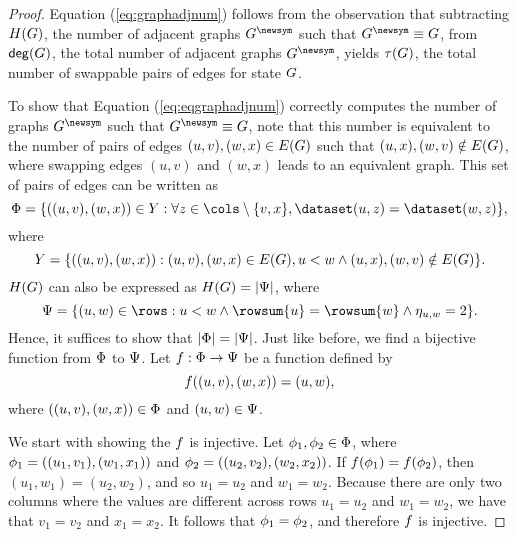 \begin{proof}
  Equation (\ref{eq:graphadjnum}) follows from the observation that subtracting
  $H(G)$, the number of adjacent graphs $\graphadj$ such that
  $\graphadj \equiv \graph$, from $\mathsf{deg}(G)$, the total number of
  adjacent graphs $\graphadj$, yields $\tau(G)$, the total number
  of swappable pairs of edges for state $G$.

  To show that Equation (\ref{eq:eqgraphadjnum}) correctly computes the
  number of graphs $\graphadj$ such that $\graphadj \equiv \graph$, note
  that this number is equivalent to the number of pairs of edges $(u, v), (w,
  x) \in E(G)$ such that $(u, x), (w, v) \notin E(G)$,
  where swapping edges $(u, v)$ and $(w, x)$ leads to an equivalent graph.
  This set of pairs of edges can be written as
  \[
    \spairsgieq = \{((u, v), (w, x)) \in \spairsgi : \forall z \in \cols
    \setminus \{v, x\}, \dataset(u, z) = \dataset(w, z)\},
  \]
  where
  \[
    Y = \{((u, v), (w, x)) : (u, v), (w, x) \in E(G), u < w
    \wedge (u, x), (w, v) \notin E(G)\}.
  \]
  $H(G)$ can also be expressed as $H(G) =
  |\Psi|$, where
  \[
    \eqgraphs = \{(u, w) \in \rows : u < w \wedge \rowsum{u} = \rowsum{w}
    \wedge \colsneqnum{u}{w} = 2\}.
  \]
  Hence, it suffices to show that $|\Phi| = |\Psi|$. Just like
  before, we find a bijective function from $\Phi$ to $\Psi$.
  Let $f : \Phi \rightarrow \Psi$ be a function defined by
  \[
    f((u, v), (w, x)) = (u, w),
  \]
  where $((u, v), (w, x)) \in \Phi$ and $(u, w) \in \Psi$.

  We start with showing the $f$ is injective. Let $\phi_{1},
  \phi_{2} \in \Phi$, where $\phi_{1} = ((u_1, v_1),
  (w_1, x_1))$ and $\phi_{2} = ((u_2, v_2), (w_2, x_2))$. If
  $f(\phi_{1}) = f(\phi_{2})$, then $(u_1,
  w_1) = (u_2, w_2)$, and so $u_1 = u_2$ and $w_1 = w_2$. Because there are
  only two columns where the values are different across rows $u_1 = u_2$ and
  $w_1 = w_2$, we have that $v_1 = v_2$ and $x_1 = x_2$. It follows that
  $\phi_{1} = \phi_{2}$, and therefore $f$ is
  injective.


\end{proof}
